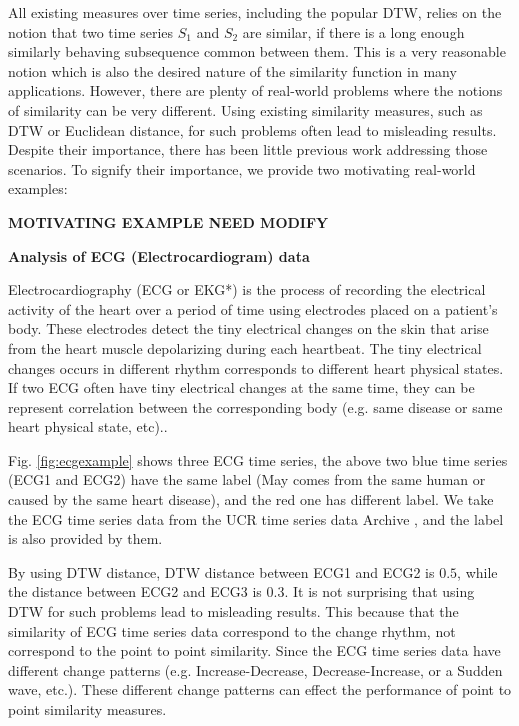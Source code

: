 All existing measures over time series, including the popular DTW, relies on the notion that two time series $S_1$ and $S_2$ are similar, if there is a long enough similarly behaving subsequence common between them. This is a very reasonable notion which is also the desired nature of the similarity function in many applications.  However, there are plenty of real-world problems where the notions of similarity can be very different. Using existing similarity measures, such as DTW or Euclidean distance, for such problems often lead to misleading results. Despite their importance, there has been little previous work addressing those scenarios. To signify their importance, we provide two motivating real-world examples:


{\bf \color{red} MOTIVATING EXAMPLE NEED MODIFY}

\textbf{Analysis of ECG (Electrocardiogram) data}

Electrocardiography \cite{holter1961new} (ECG or EKG*)
is the process of recording the electrical activity of the heart over a period of time using electrodes placed on a patient's body.
These electrodes detect the tiny electrical changes on the skin that arise from the heart muscle depolarizing during each heartbeat.
The tiny electrical changes occurs in different rhythm corresponds to different heart physical states. If two ECG often have tiny electrical changes at the same time, they can be represent correlation between the corresponding body (e.g. same disease or same heart physical state, etc).\cite{marriott1988practical}.

Fig. \ref{fig:ecgexample} shows three ECG time series, the above two blue time series (ECG1 and ECG2) have the same label (May comes from the same human or caused by the same heart disease), and the red one has different label. We take the ECG time series data from the UCR time series data Archive \cite{UCRArchive}, and the label is also provided by them.

By using DTW distance, DTW distance between ECG1 and ECG2 is $0.5$, while the distance between ECG2 and ECG3 is $0.3$.
It is not surprising that using DTW for such problems lead to misleading results.
This because that the similarity of ECG time series data correspond to the change rhythm, not correspond to the point to point similarity.
Since the ECG time series data have different change patterns (e.g. Increase-Decrease, Decrease-Increase, or a Sudden wave, etc.). These different change patterns can effect the performance of point to point similarity measures.

